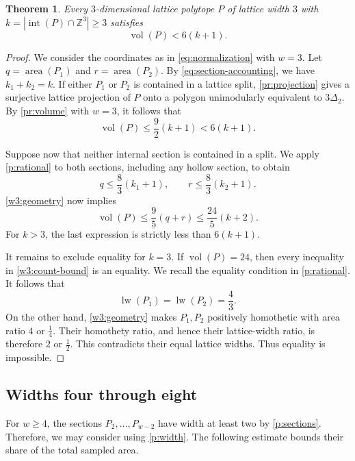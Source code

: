 \documentclass[reqno, 11pt]{article}
\numberwithin{equation}{section}
\newtheorem{theorem}{Theorem}[section]
\theoremstyle{definition}
\newcommand{\Z}{\mathbb Z}
\DeclareMathOperator{\Int}{int}
\DeclareMathOperator{\vol}{vol}
\DeclareMathOperator{\area}{area}
\DeclareMathOperator{\lw}{lw}
\numberwithin{equation}{section}
\begin{document}
\begin{theorem}\label{w3:strict}
Every $3$-dimensional lattice polytope $P$ of lattice width $3$ with $k=|\Int(P)\cap\Z^3|\ge3$ satisfies
\[
 \vol(P)<6(k+1).
\]
\end{theorem}
\begin{proof}
We consider the coordinates as in \eqref{eq:normalization} with $w=3$. Let $q=\area(P_1)$ and $r=\area(P_2)$.
By \eqref{eq:section-accounting}, we have $k_1+k_2=k$.
If either $P_1$ or $P_2$ is contained in a lattice split, \cref{pr:projection} gives a surjective lattice projection of $P$ onto a polygon unimodularly equivalent to $3\Delta_2$. By \cref{pr:volume} with $w=3$, it follows that 
\[
 \vol(P)\le\frac92(k+1)<6(k+1).
\]

Suppose now that neither internal section is contained in a split.
We apply \cref{p:rational} to both sections, including any hollow section, to obtain
\[
 q\le\frac83(k_1+1),\qquad
 r\le\frac83(k_2+1).
\]
\cref{w3:geometry} now implies
\begin{equation}\label{w3:count-bound}
 \vol(P)\le\frac95(q+r)\le\frac{24}{5}(k+2).
\end{equation}
For $k>3$, the last expression is strictly less than $6(k+1)$.

It remains to exclude equality for $k=3$. If $\vol(P)=24$, then every inequality in \eqref{w3:count-bound} is an equality. 
We recall the equality condition in \cref{p:rational}. It follows that 
\[
 \lw(P_1)=\lw(P_2)=\frac43.
\]
On the other hand, \cref{w3:geometry} makes $P_1,P_2$ positively homothetic with area ratio $4$ or $\frac{1}{4}$. Their
homothety ratio, and hence their lattice-width ratio, is therefore $2$ or $\frac{1}{2}$. This contradicts their equal lattice widths. Thus equality is impossible.
\end{proof}

\subsection{Widths four through eight}

For $w\ge4$, the sections $P_2,\ldots,P_{w-2}$ have width at least two by \cref{p:sections}. 
Therefore, we may consider using \cref{p:width}.
The following estimate bounds their share of the total sampled area.
\end{document}

